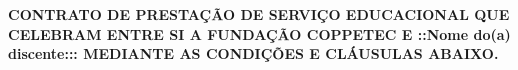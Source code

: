 \documentclass[a4paper,7.5pt]{article}
\begin{document}
\lfoot{}
\cfoot{}
\rfoot{\thepage/\pageref{LastPage}}
\renewcommand{\headrulewidth}{0.4pt}
\renewcommand{\footrulewidth}{0.4pt}

\begin{flushright}
	\parbox{9.5cm}{    	
           	 \fontsize{7.5}{12}\selectfont
    			\bf{CONTRATO DE PRESTAÇÃO DE SERVIÇO EDUCACIONAL QUE CELEBRAM ENTRE SI A FUNDAÇÃO COPPETEC E ::Nome do(a) discente::: MEDIANTE AS CONDIÇÕES E CLÁUSULAS ABAIXO.}
	}
\end{flushright}
\end{document}
